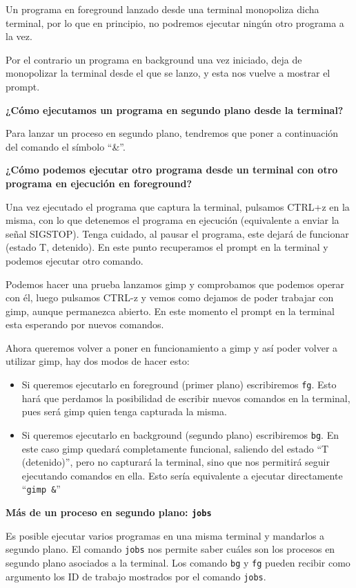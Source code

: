 \documentclass[12pt]{article}
\begin{document}
Un programa en foreground lanzado desde una terminal monopoliza dicha
terminal, por lo que en principio, no podremos ejecutar ningún otro 
programa a la vez. 

Por el contrario un programa en background una vez iniciado, deja de 
monopolizar la terminal desde el que se lanzo, y esta nos vuelve a 
mostrar el prompt.

{\bf ¿Cómo ejecutamos un programa en segundo plano desde la terminal? }

Para lanzar un proceso en segundo plano, tendremos que poner a continuación 
del comando el símbolo ``\&''. 


{\bf ¿Cómo podemos ejecutar otro programa desde un terminal con otro
 programa en ejecución en foreground?}

Una vez ejecutado el programa que captura la terminal, pulsamos CTRL+z 
en la misma, con lo que detenemos el programa en ejecución (equivalente
a enviar la señal SIGSTOP). Tenga cuidado, al pausar el programa, este 
dejará de funcionar (estado T, detenido). En este punto recuperamos 
el prompt en la terminal y podemos ejecutar otro comando. 

 Podemos hacer una prueba lanzamos gimp y comprobamos que podemos operar con él, luego pulsamos CTRL-z y vemos como dejamos de poder trabajar con gimp, aunque permanezca abierto. En este momento el prompt en la terminal esta 
esperando por nuevos comandos.  

Ahora queremos volver a poner en funcionamiento a gimp y así poder volver a utilizar gimp, hay dos modos de hacer esto: 

\begin{itemize}
\item Si queremos ejecutarlo en foreground  (primer plano) escribiremos 
\texttt{fg}.
Esto hará que perdamos la posibilidad de escribir nuevos comandos en la 
terminal, pues será gimp quien tenga capturada la misma. 

\item Si queremos ejecutarlo en background (segundo plano) escribiremos 
\texttt{bg}. En este caso gimp quedará completamente funcional, saliendo 
del estado ``T (detenido)'', pero no capturará la terminal, sino que 
nos permitirá seguir ejecutando comandos en ella. Esto sería equivalente
a ejecutar directamente ``\texttt{gimp \&}''
\end{itemize}

{\bf Más de un proceso en segundo plano: \texttt{jobs}}

Es posible ejecutar varios programas en una misma terminal y mandarlos a 
segundo plano. El comando \texttt{jobs} nos permite saber cuáles son los 
procesos en segundo plano asociados a la terminal. Los comando \texttt{bg}
y \texttt{fg} pueden recibir como argumento los ID de trabajo mostrados
por el comando \texttt{jobs}.
\end{document}

